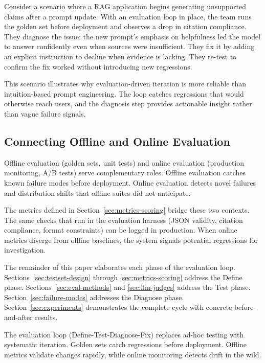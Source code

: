 Consider a scenario where a RAG application begins generating unsupported claims after a prompt update. With an evaluation loop in place, the team runs the golden set before deployment and observes a drop in citation compliance. They diagnose the issue: the new prompt's emphasis on helpfulness led the model to answer confidently even when sources were insufficient. They fix it by adding an explicit instruction to decline when evidence is lacking. They re-test to confirm the fix worked without introducing new regressions.

This scenario illustrates why evaluation-driven iteration is more reliable than intuition-based prompt engineering. The loop catches regressions that would otherwise reach users, and the diagnosis step provides actionable insight rather than vague failure signals.

\subsection{Connecting Offline and Online Evaluation}

Offline evaluation (golden sets, unit tests) and online evaluation (production monitoring, A/B tests) serve complementary roles. Offline evaluation catches known failure modes before deployment. Online evaluation detects novel failures and distribution shifts that offline suites did not anticipate.

The metrics defined in Section~\ref{sec:metrics-scoring} bridge these two contexts. The same checks that run in the evaluation harness (JSON validity, citation compliance, format constraints) can be logged in production. When online metrics diverge from offline baselines, the system signals potential regressions for investigation.

The remainder of this paper elaborates each phase of the evaluation loop. Sections~\ref{sec:testset-design} through \ref{sec:metrics-scoring} address the Define phase. Sections~\ref{sec:eval-methods} and \ref{sec:llm-judges} address the Test phase. Section~\ref{sec:failure-modes} addresses the Diagnose phase. Section~\ref{sec:experiments} demonstrates the complete cycle with concrete before-and-after results.

\begin{keytakeaways}
The evaluation loop (Define-Test-Diagnose-Fix) replaces ad-hoc testing with systematic iteration. Golden sets catch regressions before deployment. Offline metrics validate changes rapidly, while online monitoring detects drift in the wild.
\end{keytakeaways}
